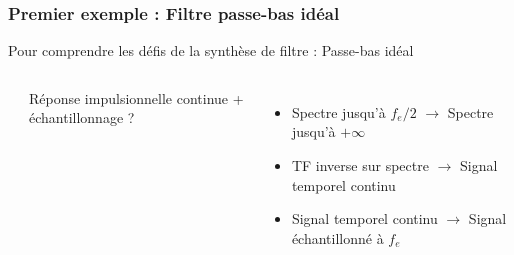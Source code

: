 \documentclass{beamer}
\begin{document}
\begin{frame}
\frametitle{Premier exemple :  Filtre passe-bas idéal}


\vspace{0.3cm}
Pour comprendre les défis de la synthèse de filtre : Passe-bas idéal\\
\vspace{0.3cm}
\begin{columns}

\column{60mm}
\begin{center}
\end{center}

\column{60mm}
Réponse impulsionnelle continue + échantillonnage ? \\
\vspace{0.1cm}
\begin{itemize}
\item<2-> Spectre jusqu'à $f_e/2$ $\rightarrow$ Spectre jusqu'à $+ \infty$
\vspace{0.1cm}
\item<3-> TF inverse sur spectre $\rightarrow$ Signal temporel continu 
\vspace{0.1cm}
\item<4-> Signal temporel continu  $\rightarrow$ Signal échantillonné à $f_e$
\vspace{0.1cm}
\end{itemize}

\end{columns}
\end{frame}
\end{document}
